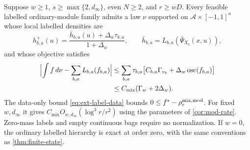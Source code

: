 \begin{theorem}\label{thm:finite-state-mod}
Suppose $w\ge1$, $s\ge\max\{2,d_\infty\}$, even $N\ge2$, and $r\ge wD$.
Every feasible labelled ordinary-module family admits a law $\nu$ supported
on $\mathcal A\times[-1,1]^n$ whose local labelled densities are
\begin{equation}\label{eq:ext-label-correction}
 h^+_{b,a}(u)=\frac{\bar h_{b,a}(u)+\Delta_w\tau_{b,a}}{1+\Delta_w},
 \qquad \bar h_{b,a}=L_{b,a}(\bar\Psi_{X_b}(x,u)),
\end{equation}
and whose objective satisfies
\begin{align}
 \Bigl\lvert\int f\,d\nu-\sum_{b,a}L_{b,a}(f_{b,a})\Bigr\rvert
 &\le\sum_{b,a}\tau_{b,a}
   \bigl[C_{b,a}\Gamma_{v_b}+\Delta_w\operatorname{osc}(f_{b,a})\bigr]
       \label{eq:ext-label-weighted}\\
 &\le C_{\mathrm{mix}}(\Gamma_w+2\Delta_w).\label{eq:ext-label-data}
\end{align}
The data-only bound \eqref{eq:ext-label-data} bounds
$0\le f^{*}-\rho_r^{\mathrm{mix,mod}}$. For fixed $w,d_\infty$ it gives
$C_{\mathrm{mix}}O_{w,d_\infty}(\log^3r/r^2)$ using the parameters of
\cref{cor:mod-rate}. Zero-mass labels and empty continuous bags require no
normalization. If $w=0$, the ordinary labelled hierarchy is exact at order
zero, with the same conventions as \cref{thm:finite-state}.
\end{theorem}
